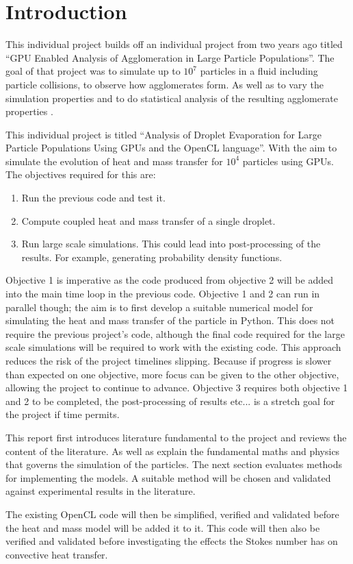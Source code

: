 \documentclass[../Interim_Report_Master]{subfiles}
\begin{document}
\hypertarget{intro}{\section{Introduction}\label{intro}}
This individual project builds off an individual project from two years ago titled ``GPU Enabled Analysis of Agglomeration in Large Particle Populations''. The goal of that project was to simulate up to $10^7$ particles in a fluid including particle collisions, to observe how agglomerates form. As well as to vary the simulation properties and to do statistical analysis of the resulting agglomerate properties \cite{Elijah_GPU_Report}. 

This individual project is titled ``Analysis of Droplet Evaporation for Large Particle Populations Using GPUs and the OpenCL language''. With the aim to simulate the evolution of heat and mass transfer for $10^4$ particles using GPUs. The objectives required for this are:
\begin{enumerate}
	\item Run the previous code and test it.
	\item Compute coupled heat and mass transfer of a single droplet.
	\item Run large scale simulations. This could lead into post-processing of the results. For example, generating probability density functions.
\end{enumerate}

Objective 1 is imperative as the code produced from objective 2 will be added into the main time loop in the previous code. Objective 1 and 2 can run in parallel though; the aim is to first develop a suitable numerical model for simulating the heat and mass transfer of the particle in Python. This does not require the previous project's code, although the final code required for the large scale simulations will be required to work with the existing code. This approach reduces the risk of the project timelines slipping. Because if progress is slower than expected on one objective, more focus can be given to the other objective, allowing the project to continue to advance. Objective 3 requires both objective 1 and 2 to be completed, the post-processing of results etc... is a stretch goal for the project if time permits.

This report first introduces literature fundamental to the project and reviews the content of the literature. As well as explain the fundamental maths and physics that governs the simulation of the particles. The next section evaluates methods for implementing the models. A suitable method will be chosen and validated against experimental results in the literature.

The existing OpenCL code will then be simplified, verified and validated before the heat and mass model will be added it to it. This code will then also be verified and validated before investigating the effects the Stokes number has on convective heat transfer.
\end{document}
